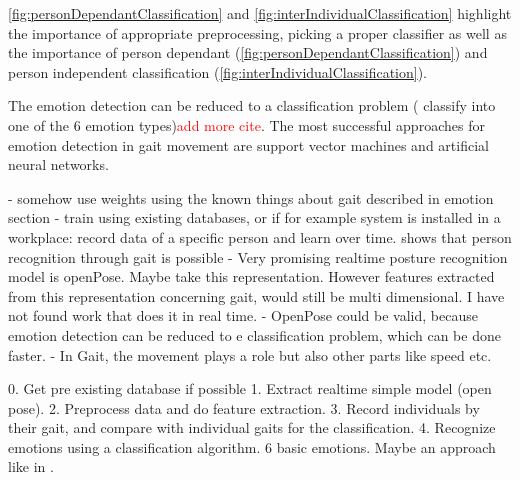 \documentclass[conference]{IEEEtran}
\newcommand\note[1]{\textcolor{red}{#1}}
\begin{document}
\autoref{fig:personDependantClassification} and \autoref{fig:interIndividualClassification} highlight the importance of appropriate preprocessing, picking a proper classifier as well as the importance of person dependant (\autoref{fig:personDependantClassification}) and person independent classification (\autoref{fig:interIndividualClassification}).


The emotion detection can be reduced to a classification problem ( classify into one of the 6 emotion types)\cite{schindler2008recognizing}\note{add more cite}. The most successful approaches for emotion detection in gait movement are support vector machines\cite{cui2016emotion,karg2012pattern} and artificial neural networks\cite{schindler2008recognizing,karg2012pattern}.

- somehow use weights using the known things about gait described in emotion section
- train using existing databases, or if for example system is installed in a workplace: record data of a specific person and learn over time. \cite{janssen2008recognition} shows that person recognition through gait is possible
- Very promising realtime posture recognition model is openPose. Maybe take this representation. However features extracted from this representation concerning gait, would still be multi dimensional. I have not found work that does it in real time.
- OpenPose could be valid, because emotion detection can be reduced to e classification problem, which can be done faster.
- In Gait, the movement plays a role but also other parts like speed etc.

0. Get pre existing database if possible
1. Extract realtime simple model (open pose).
2. Preprocess data and do feature extraction.
3. Record individuals by their gait, and compare with individual gaits for the classification. 
4. Recognize emotions using a classification algorithm. 6 basic emotions. Maybe an approach like in \cite{schindler2008recognizing}. 
\end{document}
